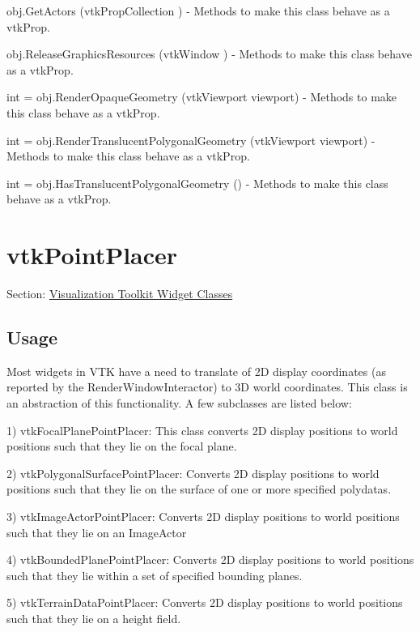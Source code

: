 \begin{DoxyItemize}
\item {\ttfamily obj.\-Get\-Actors (vtk\-Prop\-Collection )} -\/ Methods to make this class behave as a vtk\-Prop.  
\item {\ttfamily obj.\-Release\-Graphics\-Resources (vtk\-Window )} -\/ Methods to make this class behave as a vtk\-Prop.  
\item {\ttfamily int = obj.\-Render\-Opaque\-Geometry (vtk\-Viewport viewport)} -\/ Methods to make this class behave as a vtk\-Prop.  
\item {\ttfamily int = obj.\-Render\-Translucent\-Polygonal\-Geometry (vtk\-Viewport viewport)} -\/ Methods to make this class behave as a vtk\-Prop.  
\item {\ttfamily int = obj.\-Has\-Translucent\-Polygonal\-Geometry ()} -\/ Methods to make this class behave as a vtk\-Prop.  
\end{DoxyItemize}\hypertarget{vtkwidgets_vtkpointplacer}{}\section{vtk\-Point\-Placer}\label{vtkwidgets_vtkpointplacer}
Section\-: \hyperlink{sec_vtkwidgets}{Visualization Toolkit Widget Classes} \hypertarget{vtkwidgets_vtkxyplotwidget_Usage}{}\subsection{Usage}\label{vtkwidgets_vtkxyplotwidget_Usage}
Most widgets in V\-T\-K have a need to translate of 2\-D display coordinates (as reported by the Render\-Window\-Interactor) to 3\-D world coordinates. This class is an abstraction of this functionality. A few subclasses are listed below\-: 

1) vtk\-Focal\-Plane\-Point\-Placer\-: This class converts 2\-D display positions to world positions such that they lie on the focal plane. 

2) vtk\-Polygonal\-Surface\-Point\-Placer\-: Converts 2\-D display positions to world positions such that they lie on the surface of one or more specified polydatas. 

3) vtk\-Image\-Actor\-Point\-Placer\-: Converts 2\-D display positions to world positions such that they lie on an Image\-Actor 

4) vtk\-Bounded\-Plane\-Point\-Placer\-: Converts 2\-D display positions to world positions such that they lie within a set of specified bounding planes. 

5) vtk\-Terrain\-Data\-Point\-Placer\-: Converts 2\-D display positions to world positions such that they lie on a height field. 

